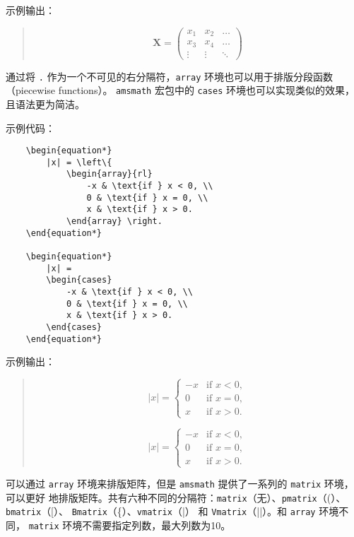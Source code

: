 \documentclass[UTF8]{ctexart}
\begin{document}
示例输出：
\begin{quote}
    \begin{equation*}
        \mathbf{X} = \left(
            \begin{array}{ccc}
                x_1 & x_2 & \ldots \\
                x_3 & x_4 & \ldots \\
                \vdots & \vdots & \ddots
            \end{array} \right)
    \end{equation*}
\end{quote}

通过将 \texttt{.} 作为一个不可见的右分隔符，\texttt{array} 环境也可以用于排版分段函数（piecewise functions）。
\texttt{amsmath} 宏包中的 \texttt{cases} 环境也可以实现类似的效果，且语法更为简洁。

示例代码：
\begin{verbatim}
    \begin{equation*}
        |x| = \left\{
            \begin{array}{rl}
                -x & \text{if } x < 0, \\
                0 & \text{if } x = 0, \\
                x & \text{if } x > 0.
            \end{array} \right.
    \end{equation*}

    \begin{equation*}
        |x| =
        \begin{cases}
            -x & \text{if } x < 0, \\
            0 & \text{if } x = 0, \\
            x & \text{if } x > 0.
        \end{cases}
    \end{equation*}
\end{verbatim}

示例输出：
\begin{quote}
    \begin{equation*}
        |x| = \left\{
            \begin{array}{rl}
                -x & \text{if } x < 0, \\
                0 & \text{if } x = 0, \\
                x & \text{if } x > 0.
            \end{array} \right.
    \end{equation*}

    \begin{equation*}
        |x| =
        \begin{cases}
            -x & \text{if } x < 0, \\
            0 & \text{if } x = 0, \\
            x & \text{if } x > 0.
        \end{cases}
    \end{equation*}
\end{quote}

可以通过 \texttt{array} 环境来排版矩阵，但是 \texttt{amsmath} 提供了一系列的 \texttt{matrix} 环境，可以更好
地排版矩阵。共有六种不同的分隔符：\texttt{matrix}（无）、\texttt{pmatrix}（(）、\texttt{bmatrix}（[）、
\texttt{Bmatrix}（\{）、\texttt{vmatrix}（|） 和 \texttt{Vmatrix}（||）。和 \texttt{array} 环境不同，
\texttt{matrix} 环境不需要指定列数，最大列数为10。
\end{document}
